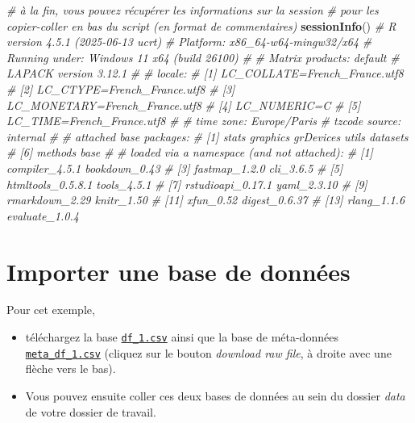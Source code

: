 \documentclass[
]{book}
\newenvironment{Shaded}{\begin{snugshade}}{\end{snugshade}}
\newcommand{\CommentTok}[1]{\textcolor[rgb]{0.56,0.35,0.01}{\textit{#1}}}
\newcommand{\FunctionTok}[1]{\textcolor[rgb]{0.13,0.29,0.53}{\textbf{#1}}}
\newcommand{\NormalTok}[1]{#1}
\providecommand{\tightlist}{%
  \setlength{\itemsep}{0pt}\setlength{\parskip}{0pt}}
\begin{document}
\begin{Shaded}
\begin{Highlighting}[]
\CommentTok{\# à la fin, vous pouvez récupérer les informations sur la session }
\CommentTok{\# pour les copier{-}coller en bas du script (en format de commentaires)}
\FunctionTok{sessionInfo}\NormalTok{()}
\CommentTok{\# R version 4.5.1 (2025{-}06{-}13 ucrt)}
\CommentTok{\# Platform: x86\_64{-}w64{-}mingw32/x64}
\CommentTok{\# Running under: Windows 11 x64 (build 26100)}
\CommentTok{\# }
\CommentTok{\# Matrix products: default}
\CommentTok{\#   LAPACK version 3.12.1}
\CommentTok{\# }
\CommentTok{\# locale:}
\CommentTok{\# [1] LC\_COLLATE=French\_France.utf8 }
\CommentTok{\# [2] LC\_CTYPE=French\_France.utf8   }
\CommentTok{\# [3] LC\_MONETARY=French\_France.utf8}
\CommentTok{\# [4] LC\_NUMERIC=C                  }
\CommentTok{\# [5] LC\_TIME=French\_France.utf8    }
\CommentTok{\# }
\CommentTok{\# time zone: Europe/Paris}
\CommentTok{\# tzcode source: internal}
\CommentTok{\# }
\CommentTok{\# attached base packages:}
\CommentTok{\# [1] stats     graphics  grDevices utils     datasets }
\CommentTok{\# [6] methods   base     }
\CommentTok{\# }
\CommentTok{\# loaded via a namespace (and not attached):}
\CommentTok{\#  [1] compiler\_4.5.1    bookdown\_0.43    }
\CommentTok{\#  [3] fastmap\_1.2.0     cli\_3.6.5        }
\CommentTok{\#  [5] htmltools\_0.5.8.1 tools\_4.5.1      }
\CommentTok{\#  [7] rstudioapi\_0.17.1 yaml\_2.3.10      }
\CommentTok{\#  [9] rmarkdown\_2.29    knitr\_1.50       }
\CommentTok{\# [11] xfun\_0.52         digest\_0.6.37    }
\CommentTok{\# [13] rlang\_1.1.6       evaluate\_1.0.4 }
\end{Highlighting}
\end{Shaded}

\section{Importer une base de données}\label{importer-une-base-de-donnuxe9es}

Pour cet exemple,

\begin{itemize}
\tightlist
\item
  téléchargez la base \href{https://github.com/benoitlepage/formationR/blob/main/data/df_1.csv}{\texttt{df\_1.csv}} ainsi que la base de méta-données \href{https://github.com/benoitlepage/formationR/blob/main/data/meta_df_1.csv}{\texttt{meta\_df\_1.csv}} (cliquez sur le bouton \emph{download raw file}, à droite avec une flèche vers le bas).
\item
  Vous pouvez ensuite coller ces deux bases de données au sein du dossier \emph{data} de votre dossier de travail.
\end{itemize}
\end{document}
